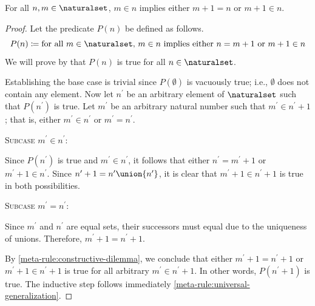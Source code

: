\begin{thm}
     \label{thm:metatheory-m-less-than-n-implies-m-plus-one-equals-n-or-m-plus-one-less-than-n}
    For all \( n, m \in \naturalset \), \( m \in n \) implies either \( m + 1 = n \) or \( m + 1 \in n \).
\end{thm}

\begin{proof}
    Let the predicate \( P(n) \) be defined as follows.
    \begin{equation*}
        P(n) \coloneq \text{for all \( m \in \naturalset \), \( m \in n \) implies either \( n = m + 1\) or \( m + 1 \in n \)}
    \end{equation*}
    We will prove by  that \( P(n) \) is true for all \( n \in \naturalset \).

    \vspace{0.3cm}
    \noindent
    Establishing the base case is trivial since \( P(\emptyset) \) is vacuously true; i.e., \( \emptyset \) does not contain any element.
    Now let \( n^{\prime} \) be an arbitrary element of \( \naturalset \) such that \( P(n^{\prime}) \) is true.
    Let \( m^{\prime} \) be an arbitrary natural number such that \( m^{\prime} \in n^{\prime} + 1 \); that is, either \( m^{\prime} \in n^{\prime} \)
    or \( m^{\prime} = n^{\prime} \).

    \vspace{0.3cm}
    \noindent
    {\scshape Subcase} \( m^{\prime} \in n^{\prime} \):

    \vspace{0.1cm}
    \noindent
    Since \( P(n^{\prime}) \) is true and \( m^{\prime} \in n^{\prime} \), it follows that either \( n^{\prime} = m^{\prime} + 1 \) or \( m^{\prime} + 1 \in n^{\prime} \).
    Since \( n^{\prime} + 1 = n^{\prime} \union \mleft\{ n^{\prime} \mright\} \), it is clear that \( m^{\prime} + 1 \in n^{\prime} + 1 \) is true in both possibilities.

    \vspace{0.3cm}
    \noindent
    {\scshape Subcase} \( m^{\prime} = n^{\prime} \):

    \vspace{0.1cm}
    \noindent
    Since \( m^{\prime} \) and \( n^{\prime} \) are equal sets, their successors must equal due to the uniqueness of unions.
    Therefore, \( m^{\prime} + 1 = n^{\prime} + 1 \).

    \vspace{0.3cm}
    \noindent
    By \cref{meta-rule:constructive-dilemma}, we conclude that either \( m^{\prime} + 1 = n^{\prime} + 1 \) or \( m^{\prime} + 1 \in n^{\prime} + 1 \) is true
    for all arbitrary \( m^{\prime} \in n^{\prime} + 1 \).
    In other words, \( P(n^{\prime} + 1) \) is true.
    The inductive step follows immediately \cref{meta-rule:universal-generalization}.
\end{proof}

